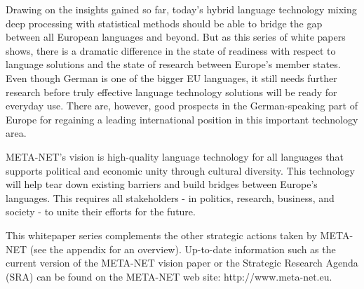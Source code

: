 \documentclass[]{../../metanetpaper}
\begin{document}
\begin{Parallel}[c]{79mm}{78mm}
{    
Drawing on the insights gained so far, today’s hybrid language technology mixing deep processing with statistical methods should be able to bridge the gap between all European languages and beyond. But as this series of white papers shows, there is a dramatic difference in the state of readiness with respect to language solutions and the state of research between Europe’s member states. Even though German is one of the bigger EU languages, it still needs further research before truly effective language technology solutions will be ready for everyday use. There are, however, good prospects in the German-speaking part of Europe for regaining a leading international position in this important technology area. 

META-NET’s vision is high-quality language technology for all languages that supports political and economic unity through cultural diversity. This technology will help tear down existing barriers and build bridges between Europe’s languages. This requires all stakeholders - in politics, research, business, and society - to unite their efforts for the future.

This whitepaper series complements the other strategic actions taken by META-NET (see the appendix for an overview). Up-to-date information such as the current version of the META-NET vision paper\cite{Meta1} or the Strategic Research Agenda (SRA) can be found on the META-NET web site: http://www.meta-net.eu.


  }
  
  \ParallelPar
  
  \clearpage
  
  
  
\end{Parallel}
\end{document}
